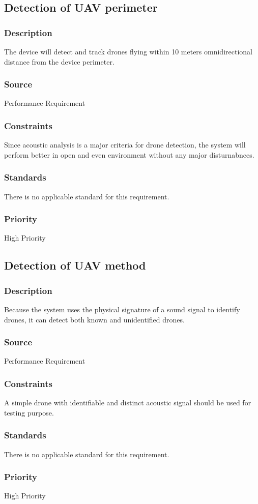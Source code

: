 \subsection{Detection of UAV perimeter}
\subsubsection{Description}
The device will detect and track drones flying within 10 meters omnidirectional distance from the device perimeter.
\subsubsection{Source}
Performance Requirement
\subsubsection{Constraints}
Since acoustic analysis is a major criteria for drone detection, the system will perform better in open and even environment without any major disturnabnces.
\subsubsection{Standards}
There is no applicable standard for this requirement.
\subsubsection{Priority}
High Priority

\subsection{Detection of UAV method}
\subsubsection{Description}
Because the system uses the physical signature of a sound signal to identify drones, it can detect both known and unidentified drones.
\subsubsection{Source}
Performance Requirement
\subsubsection{Constraints}
A simple drone with identifiable and distinct acoustic signal should be used for testing purpose.
\subsubsection{Standards}
There is no applicable standard for this requirement.
\subsubsection{Priority}
High Priority
